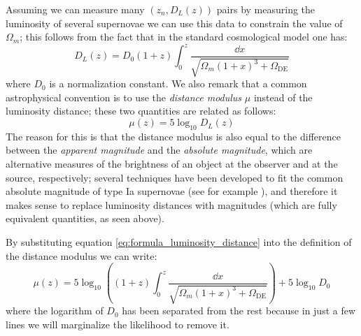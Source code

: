 Assuming we can measure many $(z_n, D_L(z))$ pairs by measuring the luminosity of several supernovae we can use this data to constrain the value of $\Omega_m$; this follows from the fact that in the standard cosmological model one has:
\begin{equation}
\label{eq:formula_luminosity_distance}
    D_L(z) = D_0(1+z) \int_0^z \frac{\dd{x}}{\sqrt{\Omega_m(1+x)^3 + \Omega_{\text{DE}}}}
\end{equation}
where $D_0$ is a normalization constant.
We also remark that a common astrophysical convention is to use the \emph{distance modulus} $\mu$ instead of the luminosity distance; these two quantities are related as follows:
\begin{equation*}
    \mu(z) = 5\log_{10}D_L(z)
\end{equation*}
The reason for this is that the distance modulus is also equal to the difference between the \emph{apparent magnitude} and the \emph{absolute magnitude}, which are alternative measures of the brightness of an object at the observer and at the source, respectively; several techniques have been developed to fit the common absolute magnitude of type Ia supernovae (see for example \cite{supernovae_bhm}), and therefore it makes sense to replace luminosity distances with magnitudes (which are fully equivalent quantities, as seen above).

By substituting equation \eqref{eq:formula_luminosity_distance} into the definition of the distance modulus we can write:
\begin{equation}
\label{eq:formula_distance_modulus}
    \mu(z) = 5\log_{10} \left((1+z) \int_0^z \frac{\dd{x}}{\sqrt{\Omega_m(1+x)^3 + \Omega_{\text{DE}}}}\right) + 5\log_{10} D_0
\end{equation}
where the logarithm of $D_0$ has been separated from the rest because in just a few lines we will marginalize the likelihood to remove it.


